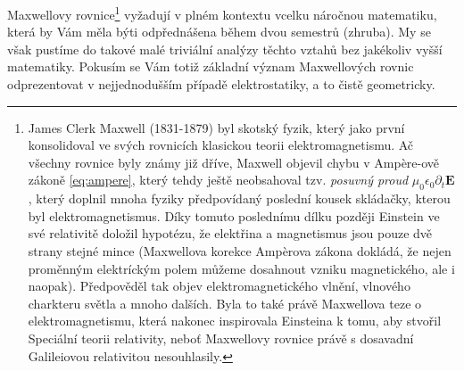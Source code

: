 \documentclass[11pt,a4paper]{report}
\renewcommand{\vec}{\boldsymbol}
\begin{document}
		Maxwellovy rovnice\footnote{James Clerk Maxwell (1831-1879) byl skotský fyzik, který jako první konsolidoval ve svých rovnicích klasickou teorii elektromagnetismu. Ač všechny rovnice byly známy již dříve, Maxwell objevil chybu v Ampère-ově zákoně \eqref{eq:ampere}, který tehdy ještě neobsahoval tzv. \textit{posuvný proud} $\mu_0 \epsilon_0 \partial_t \vec E$, který doplnil mnoha fyziky předpovídaný poslední kousek skládačky, kterou byl elektromagnetismus. Díky tomuto poslednímu dílku později Einstein ve své relativitě doložil hypotézu, že elektřina a magnetismus jsou pouze dvě strany stejné mince (Maxwellova korekce Ampèrova zákona dokládá, že nejen proměnným elektríckým polem můžeme dosahnout vzniku magnetického, ale i naopak). Předpověděl tak objev elektromagnetického vlnění, vlnového charkteru světla a mnoho dalších. Byla to také právě Maxwellova teze o elektromagnetismu, která nakonec inspirovala Einsteina k tomu, aby stvořil Speciální teorii relativity, neboť Maxwellovy rovnice právě s dosavadní Galileiovou relativitou nesouhlasily.} vyžadují v plném kontextu vcelku náročnou matematiku, která by Vám měla býti odpřednášena během dvou semestrů (zhruba). My se však pustíme do takové malé triviální analýzy těchto vztahů bez jakékoliv vyšší matematiky. Pokusím se Vám totiž základní význam Maxwellových rovnic odprezentovat v nejjednodušším případě elektrostatiky, a to čistě geometricky.
		
\end{document}
